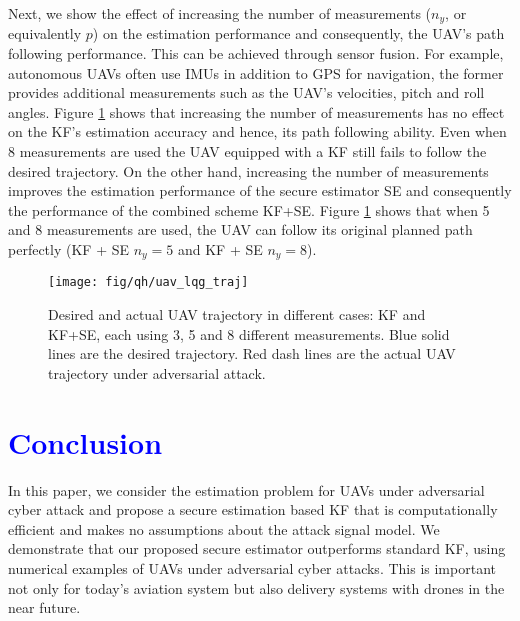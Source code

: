 \documentclass[12pt, conference, a4paper, twoside]{IEEEconf_mod}
\begin{document}
Next, we show the effect of increasing the number of measurements ($n_y$, or equivalently $p$) on the estimation performance and consequently, the UAV's path following performance. 
This can be achieved through sensor fusion. 
For example, autonomous UAVs often use IMUs in addition to GPS for navigation, the former provides additional measurements such as the UAV's velocities, pitch and roll angles. 
Figure \ref{fig:ex_uav_traj} shows that increasing the number of measurements has no effect on the KF's estimation accuracy and hence, its path following ability. 
Even when 8 measurements are used the UAV equipped with a KF still fails to follow the desired trajectory. 
On the other hand, increasing the number of measurements improves the estimation performance of the secure estimator SE and consequently the performance of the combined scheme KF+SE. Figure \ref{fig:ex_uav_traj} shows that when 5 and 8 measurements are used, the UAV can follow its original planned path perfectly (KF + SE $n_y=5$ and KF + SE $n_y=8$).


\begin{figure}
\center
\texttt{[image: fig/qh/uav\_lqg\_traj]}
\caption{Desired and actual UAV trajectory in different cases: KF and KF+SE, each using 3, 5 and 8 different measurements. Blue solid lines are the desired trajectory. Red dash lines are the actual UAV trajectory under adversarial attack.}
\label{fig:ex_uav_traj}
\end{figure}



\section*{\textcolor{blue}{Conclusion}}
In this paper, we consider the estimation problem for UAVs under adversarial cyber attack and propose a secure estimation based KF that is computationally efficient and makes no assumptions about the attack signal model. 
We demonstrate that our proposed secure estimator outperforms standard KF, using numerical examples of UAVs under adversarial cyber attacks. This is important not only for today's aviation system but also delivery systems with drones in the near future. 




\tiny

\bigskip

\end{document}
